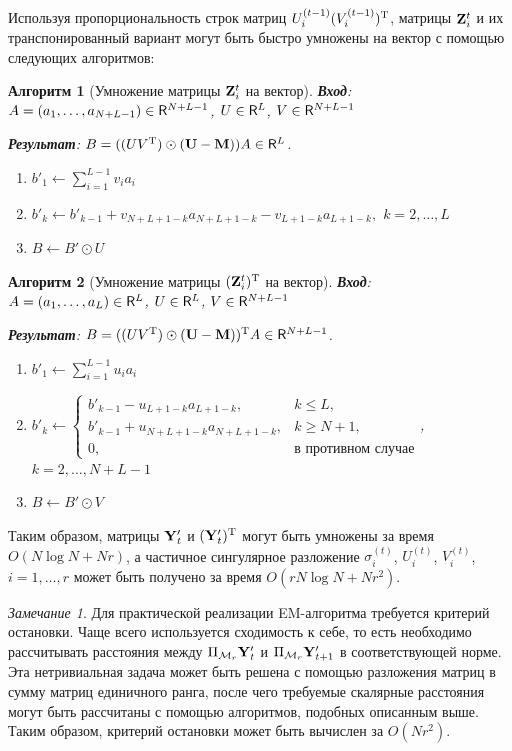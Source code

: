 \documentclass[12pt, specialist, subf,href,colorlinks=true,substylefile = spbu.rtx]{disser}
\newtheorem{algorithm}{Алгоритм}
\theoremstyle{remark}
\newtheorem{remark}{Замечание}
\theoremstyle{definition}
\begin{document}
Используя пропорциональность строк матриц $U_i^{(t-1)} (V_i^{(t-1)})^{\mathrm{T}}$, матрицы $\mathbf{Z}^{t}_i$ и их транспонированный вариант могут быть быстро умножены на вектор с помощью следующих алгоритмов:
\begin{algorithm}[Умножение матрицы $\mathbf{Z}^{t}_i$ на вектор]
	\textbf{Вход}: $A = (a_1, \ldots, a_{N + L - 1}) \in \mathsf{R}^{N + L - 1}$, $U \in \mathsf{R}^L$, $V \in \mathsf{R}^{N + L - 1}$
	
	\textbf{Результат}:
	$B = ((U V^{\mathrm{T}}) \odot (\mathbf{U}-\mathbf{M})) A \in \mathsf{R}^L$.
	
	\begin{enumerate}
		\item
		$b'_1 \leftarrow \sum\limits_{i=1}^{L-1}v_i a_i$
		\item
		$b'_k \leftarrow b'_{k-1} + v_{N + L + 1 - k}a_{N + L + 1 - k} - v_{L + 1 - k}a_{L + 1 - k},$ $k = 2, \ldots, L$
		\item
		$B \leftarrow B' \odot U$
	\end{enumerate}
\end{algorithm}

\begin{algorithm}[Умножение матрицы $(\mathbf{Z}^{t}_i)^{\mathrm{T}}$ на вектор]
	\textbf{Вход}: $A = (a_1, \ldots, a_L) \in \mathsf{R}^L$, $U \in \mathsf{R}^L$, $V \in \mathsf{R}^{N + L - 1}$
	
	\textbf{Результат}:
	$B = ((U V^{\mathrm{T}}) \odot (\mathbf{U}-\mathbf{M}))^{\mathrm{T}} A \in \mathsf{R}^{N + L - 1}$.
	
	\begin{enumerate}
		\item
		$b'_1 \leftarrow \sum\limits_{i=1}^{L - 1}u_i a_i$
		\item
		$b'_k \leftarrow \begin{cases}
		b'_{k - 1} - u_{L + 1 - k} a_{L + 1 - k}, & k \le L, \\
		b'_{k - 1} + u_{N + L + 1 - k} a_{N + L + 1 - k}, & k \ge N + 1,\\
		0, & \text{в противном случае}
		\end{cases}$, $k = 2, \ldots, N + L - 1$
		\item
		$B \leftarrow B' \odot V$
	\end{enumerate}
\end{algorithm}
Таким образом, матрицы $\mathbf{Y}'_t$ и $(\mathbf{Y}'_t)^{\mathrm{T}}$ могут быть умножены за время $O(N \log N + Nr)$, а частичное сингулярное разложение $\sigma_i^{(t)}$, $U_i^{(t)}$, $V_i^{(t)}$, $i = 1, \ldots, r$ может быть получено за время $O(r N \log N + N r^2)$. 
\begin{remark}
	Для практической реализации EM-алгоритма требуется критерий остановки. Чаще всего используется сходимость к себе, то есть необходимо рассчитывать расстояния между $\Pi_{\mathcal{M}_r} \mathbf{Y}'_t$ и $\Pi_{\mathcal{M}_r} \mathbf{Y}'_{t + 1}$ в соответствующей норме. Эта нетривиальная задача может быть решена с помощью разложения матриц в сумму матриц единичного ранга, после чего требуемые скалярные расстояния могут быть рассчитаны с помощью алгоритмов, подобных описанным выше. Таким образом, критерий остановки может быть вычислен за $O(N r^2)$.
\end{remark}
\end{document}
